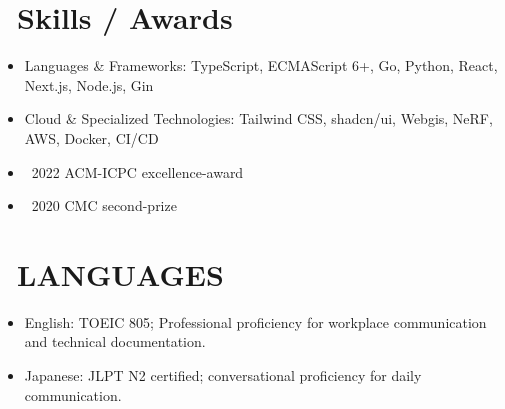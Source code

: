 \documentclass{resume}
\begin{document}

\section{\faCalendarCheckO\ Skills / Awards}
\begin{itemize}[parsep=0.5ex]
  \item Languages \& Frameworks: TypeScript, ECMAScript 6+, Go, Python, React, Next.js, Node.js, Gin
  \item Cloud \& Specialized Technologies: Tailwind CSS, shadcn/ui, Webgis, NeRF, AWS, Docker, CI/CD
  \item {} \textbullet\ 2022 ACM-ICPC excellence-award
  \item {} \textbullet\ 2020 CMC second-prize
\end{itemize}

\section{\faGlobe\ LANGUAGES}
\begin{itemize}[parsep=0.5ex]
  \item English: TOEIC 805; Professional proficiency for workplace communication and technical documentation.
  \item Japanese: JLPT N2 certified; conversational proficiency for daily communication.
\end{itemize}
\end{document}
